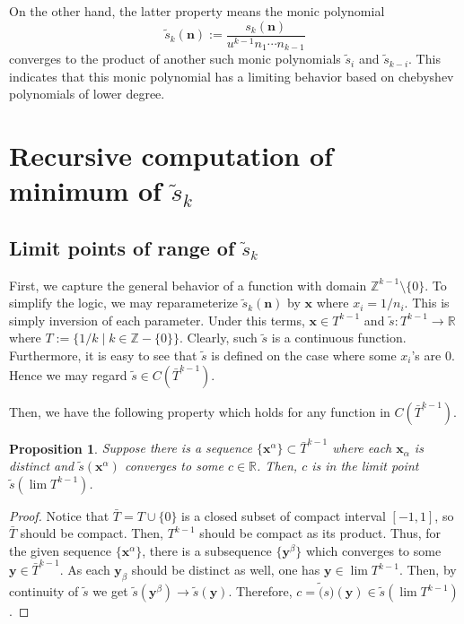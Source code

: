 \documentclass{article}
\theoremstyle{definition}
\theoremstyle{plain}
\newtheorem{proposition}{Proposition}[section]
\theoremstyle{remark}
\numberwithin{equation}{section}
\newcommand{\integer}{\mathbb{Z}}
\newcommand{\real}{\mathbb{R}}
\begin{document}
On the other hand, the latter property means the monic polynomial
\[
  \tilde{s}_k(\mathbf{n}) := \frac{s_k(\mathbf{n})}{u^{k-1} n_1 \cdots n_{k-1}}
\]
converges to the product of another such monic polynomials $\tilde{s}_i$ and $\tilde{s}_{k-i}$.
This indicates that this monic polynomial has a limiting behavior
based on chebyshev polynomials of lower degree.

\section{Recursive computation of minimum of $\tilde{s}_k$}

\subsection{Limit points of range of $\tilde{s}_k$}

First, we capture the general behavior of a function with domain $\integer^{k-1} \setminus \{0\}$.
To simplify the logic, we may reparameterize $\tilde{s}_k(\mathbf{n})$
by $\mathbf{x}$ where $x_i = 1 / n_i$.
This is simply inversion of each parameter.
Under this terms, $\mathbf{x} \in T^{k-1}$ and $\tilde{s} : T^{k-1} \to \real$
where $T := \{ 1 / k \mid k \in \integer - \{ 0 \} \}$.
Clearly, such $\tilde{s}$ is a continuous function.
Furthermore, it is easy to see that $\tilde{s}$ is defined on the case where some $x_i$'s are 0.
Hence we may regard $\tilde{s} \in C(\bar{T}^{k-1})$.

Then, we have the following property which holds for any function in $C(\bar{T}^{k-1})$.
\begin{proposition}
  Suppose there is a sequence $\{ \mathbf{x}^\alpha \} \subset \bar{T}^{k-1}$
  where each $\mathbf{x}_\alpha$ is distinct
  and $\tilde{s}(\mathbf{x}^\alpha)$ converges to some $c \in \real$.
  Then, $c$ is in the limit point $\tilde{s}(\lim T^{k-1})$.
\end{proposition}
\begin{proof}
  Notice that $\bar{T} = T \cup \{ 0 \}$ is a closed subset of compact interval $[-1, 1]$,
  so $\bar{T}$ should be compact. Then, $T^{k-1}$ should be compact as its product.
  Thus, for the given sequence $\{ \mathbf{x}^\alpha \}$,
  there is a subsequence $\{ \mathbf{y}^\beta \}$ which converges to some $\mathbf{y} \in \bar{T}^{k-1}$.
  As each $\mathbf{y}_\beta$ should be distinct as well, one has $\mathbf{y} \in \lim T^{k-1}$.
  Then, by continuity of $\tilde{s}$ we get $\tilde{s}(\mathbf{y}^\beta) \to \tilde{s}(\mathbf{y})$.
  Therefore, $c = \tilde(s)(\mathbf{y}) \in \tilde{s}(\lim T^{k-1})$.
\end{proof}
\end{document}
